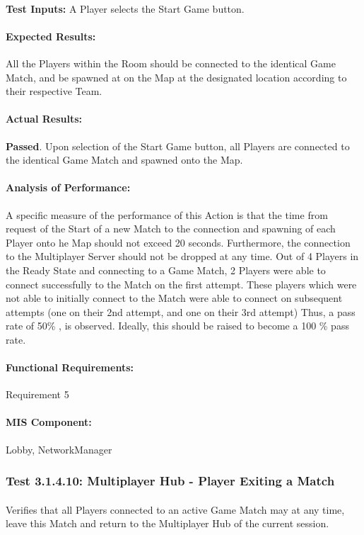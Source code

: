 \documentclass{article}
\begin{document}
    \paragraph{}\textbf{Test Inputs:} A Player selects the Start Game button.
    \paragraph{Expected Results:} All the Players within the Room should be connected to the identical Game Match, and be spawned at on the Map at the designated location according to their respective Team.
    \paragraph{Actual Results:} \textbf{Passed}. Upon selection of the Start Game button, all Players are connected to the identical Game Match and spawned onto the Map. 
    \paragraph{Analysis of Performance:} A specific measure of the performance of this Action is that the time from request of the Start of a new Match to the connection and spawning of each Player onto he Map should not exceed 20 seconds. Furthermore, the connection to the Multiplayer Server should not be dropped at any time. Out of 4 Players in the Ready State and connecting to a Game Match, 2 Players were able to connect successfully to the Match on the first attempt. These players which were not able to initially connect to the Match were able to connect on subsequent attempts (one on their 2nd attempt, and one on their 3rd attempt)  Thus, a pass rate of 50\% , is observed. Ideally, this should be raised to become a 100 \% pass rate.
     \paragraph{Functional Requirements:} Requirement 5
    \paragraph{MIS Component:} Lobby, NetworkManager
    
    \subsubsection{Test 3.1.4.10: Multiplayer Hub - Player Exiting a Match}
    \paragraph{} Verifies that all Players connected to an active Game Match may at any time, leave this Match and return to the Multiplayer Hub of the current session.
\end{document}
